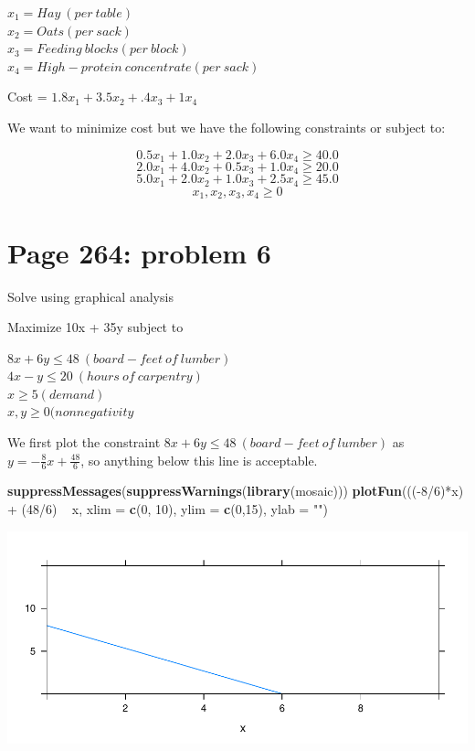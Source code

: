 \documentclass[]{article}
\newenvironment{Shaded}{\begin{snugshade}}{\end{snugshade}}
\newcommand{\KeywordTok}[1]{\textcolor[rgb]{0.13,0.29,0.53}{\textbf{{#1}}}}
\newcommand{\DataTypeTok}[1]{\textcolor[rgb]{0.13,0.29,0.53}{{#1}}}
\newcommand{\DecValTok}[1]{\textcolor[rgb]{0.00,0.00,0.81}{{#1}}}
\newcommand{\StringTok}[1]{\textcolor[rgb]{0.31,0.60,0.02}{{#1}}}
\newcommand{\NormalTok}[1]{{#1}}
\begin{document}
\(x_1 = Hay~(per~table)\)\\
\(x_2 = Oats(per~sack)\)\\
\(x_3 = Feeding~blocks(per~block)\)\\
\(x_4 = High-protein~concentrate(per~sack)\)

Cost = \(1.8x_1 + 3.5x_2 + .4x_3 + 1x_4\)

We want to minimize cost but we have the following constraints or
subject to:

\[0.5x_1 + 1.0x_2 + 2.0x_3 + 6.0x_4 \geq 40.0\]
\[2.0x_1 + 4.0x_2 + 0.5x_3 + 1.0x_4 \geq 20.0\]
\[5.0x_1 + 2.0x_2 + 1.0x_3 + 2.5x_4 \geq 45.0\]
\[x_1, x_2, x_3, x_4 \geq 0\]

\newpage

\section{Page 264: problem 6}\label{page-264-problem-6}

Solve using graphical analysis

Maximize 10x + 35y subject to

\(8x + 6y \leq 48 ~(board-feet~of~lumber)\)\\
\(4x - y \leq 20 ~ (hours~of~carpentry)\)\\
\(x \geq 5 (demand)\)\\
\(x,y \geq 0 (nonnegativity\)

We first plot the constraint \(8x + 6y \leq 48 ~(board-feet~of~lumber)\)
as \(y = -\frac{8}{6}x + \frac{48}{6}\), so anything below this line is
acceptable.

\begin{Shaded}
\begin{Highlighting}[]
\KeywordTok{suppressMessages}\NormalTok{(}\KeywordTok{suppressWarnings}\NormalTok{(}\KeywordTok{library}\NormalTok{(mosaic)))}
\KeywordTok{plotFun}\NormalTok{(((-}\DecValTok{8}\NormalTok{/}\DecValTok{6}\NormalTok{)*x) +}\StringTok{ }\NormalTok{(}\DecValTok{48}\NormalTok{/}\DecValTok{6}\NormalTok{) ~}\StringTok{ }\NormalTok{x, }\DataTypeTok{xlim =} \KeywordTok{c}\NormalTok{(}\DecValTok{0}\NormalTok{, }\DecValTok{10}\NormalTok{), }\DataTypeTok{ylim =} \KeywordTok{c}\NormalTok{(}\DecValTok{0}\NormalTok{,}\DecValTok{15}\NormalTok{), }\DataTypeTok{ylab =} \StringTok{""}\NormalTok{)}
\end{Highlighting}
\end{Shaded}

\includegraphics{Christophe_Hunt_hw6_files/figure-latex/unnamed-chunk-1-1.pdf}
\end{document}
